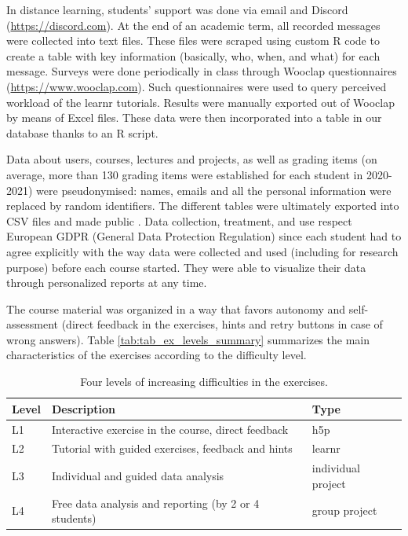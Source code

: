 \documentclass{aims}
\theoremstyle{definition}
\begin{document}
In distance learning, students' support was done via email and Discord
(\url{https://discord.com}). At the end of an academic term, all
recorded messages were collected into text files. These files were
scraped using custom R code to create a table with key information
(basically, who, when, and what) for each message. Surveys were done
periodically in class through Wooclap questionnaires
(\url{https://www.wooclap.com}). Such questionnaires were used to query
perceived workload of the learnr tutorials. Results were manually
exported out of Wooclap by means of Excel files. These data were then
incorporated into a table in our database thanks to an R script.

Data about users, courses, lectures and projects, as well as grading
items (on average, more than 130 grading items were established for each
student in 2020-2021) were pseudonymised: names, emails and all the
personal information were replaced by random identifiers. The different
tables were ultimately exported into CSV files and made public
\cite{Grosjeandataset2020}. Data collection, treatment, and use respect
European GDPR (General Data Protection Regulation) since each student
had to agree explicitly with the way data were collected and used
(including for research purpose) before each course started. They were
able to visualize their data through personalized reports at any time.

The course material was organized in a way that favors autonomy and
self-assessment (direct feedback in the exercises, hints and retry
buttons in case of wrong answers). Table
\ref {tab:tab_ex_levels_summary} summarizes the main characteristics of
the exercises according to the difficulty level.

\begin{table}

\caption{\label{tab:tab_ex_levels_summary}\label{tab:tab_ex_levels} Four levels of increasing difficulties in the exercises.}
\centering
\begin{tabular}[t]{l|l|l}
\hline
Level & Description & Type\\
\hline
L1 & Interactive exercise in the course, direct feedback & h5p\\
\hline
L2 & Tutorial with guided exercises, feedback and hints & learnr\\
\hline
L3 & Individual and guided data analysis & individual project\\
\hline
L4 & Free data analysis and reporting (by 2 or 4 students) & group project\\
\hline
\end{tabular}
\end{table}
\end{document}
